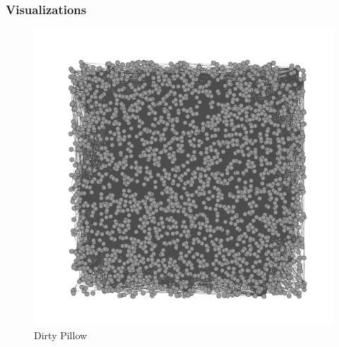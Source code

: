\documentclass{article}
\begin{document}
\subsubsection*{Visualizations}

\begin{figure}[H]
\centering
\includegraphics[scale=0.70]{q3/dirtypillow}
\caption{Dirty Pillow}
\label{dirtypillow}
\end{figure}
\end{document}
